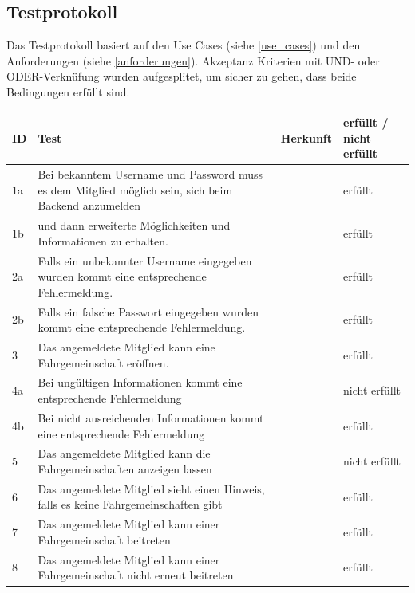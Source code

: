 \subsection{Testprotokoll}
Das Testprotokoll basiert auf den Use Cases (siehe \ref{use_cases}) und den Anforderungen (siehe \ref{anforderungen}). Akzeptanz Kriterien mit UND- oder ODER-Verknüfung wurden aufgesplitet, um sicher zu gehen, dass beide Bedingungen erfüllt sind.

\begin{longtable}{ l | p{7cm} | l | l }

	\hline
	\rowcolor{gray}
	ID	&	Test			&	Herkunft			&	erfüllt / nicht erfüllt\\ \hline
	1a	&	Bei bekanntem Username und Password muss es dem Mitglied möglich sein, sich beim Backend anzumelden			
				&	\nameref{table:req_1} 	&	erfüllt\\ \hline
	1b	&	und dann erweiterte Möglichkeiten und Informationen zu erhalten.
				&	\nameref{table:req_1} 	&	erfüllt\\ \hline
	2a	&	Falls ein unbekannter Username eingegeben wurden kommt eine entsprechende Fehlermeldung.			
				&	\nameref{table:req_1} 	&	erfüllt\\ \hline
	2b	&	Falls ein falsche Passwort eingegeben wurden kommt eine entsprechende Fehlermeldung.			
				&	\nameref{table:req_1} 	&	erfüllt\\ \hline
	3	&	Das angemeldete Mitglied kann eine Fahrgemeinschaft eröffnen.		
				&	\nameref{table:req_2} 	&	erfüllt\\ \hline
	4a	&	Bei ungültigen Informationen kommt eine entsprechende Fehlermeldung
				&	\nameref{table:req_2} 	&	nicht erfüllt\\ \hline
	4b	&	Bei nicht ausreichenden Informationen kommt eine entsprechende Fehlermeldung
				&	\nameref{table:req_2} 	&	erfüllt\\ \hline
	5	&	Das angemeldete Mitglied kann die Fahrgemeinschaften anzeigen lassen
				&	\nameref{table:req_3} 	&	nicht erfüllt\\ \hline
	6	&	Das angemeldete Mitglied sieht einen Hinweis, falls es keine Fahrgemeinschaften gibt
				&	\nameref{table:req_3} 	&	erfüllt\\ \hline
	7	&	Das angemeldete Mitglied kann einer Fahrgemeinschaft beitreten
				&	\nameref{table:req_4} 	&	erfüllt\\ \hline
	8	&	Das angemeldete Mitglied kann einer Fahrgemeinschaft nicht erneut beitreten
				&	\nameref{table:req_4} 	&	erfüllt\\ \hline

\end{longtable}
